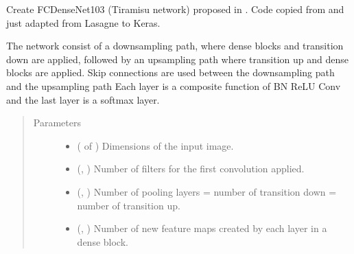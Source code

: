 \documentclass[letterpaper,10pt,english]{sphinxmanual}
\begin{document}
\begin{fulllineitems}
\label{\detokenize{models/tiramisu:models.tiramisu.FC_DenseNet103}}
Create FC\sphinxhyphen{}DenseNet103 (Tiramisu network) proposed in  . Code copied from  and just adapted from Lasagne to Keras.

The network consist of a downsampling path, where dense blocks and transition down are applied, followed by an
upsampling path where transition up and dense blocks are applied. Skip connections are used between the
downsampling path and the upsampling path Each layer is a composite function of BN \sphinxhyphen{} ReLU \sphinxhyphen{} Conv and the last
layer is a softmax layer.
\begin{quote}\begin{description}
\item[{Parameters}] \leavevmode\begin{itemize}
\item {} 
 ( of ) \textendash{} Dimensions of the input image.

\item {} 
 (, ) \textendash{} Number of filters for the first convolution applied.

\item {} 
 (, ) \textendash{} Number of pooling layers = number of transition down = number of transition up.

\item {} 
 (, ) \textendash{} Number of new feature maps created by each layer in a dense block.


\end{itemize}
\end{description}
\end{quote}
\end{fulllineitems}
\end{document}
